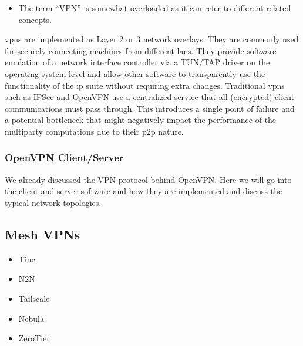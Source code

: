 \begin{itemize}
\begin{itemize}

    \begin{itemize}
    \tightlist
    \item
      The term ``VPN'' is somewhat overloaded as it can refer to
      different related concepts.
    \end{itemize}

    \glspl{vpn} are implemented as Layer 2 or 3 network overlays. They
    are commonly used for securely connecting machines from different
    \glspl{lan}. They provide software emulation of a network interface
    controller via a TUN/TAP driver on the operating system level and
    allow other software to transparently use the functionality of the
    \gls{ip} suite without requiring extra changes. Traditional
    \glspl{vpn} such as IPSec \autocite{ipSecRFC} and OpenVPN
    \autocite{openVPNDocs} use a centralized service that all
    (encrypted) client communications must pass through. This introduces
    a single point of failure and a potential bottleneck that might
    negatively impact the performance of the multiparty computations due
    to their \gls{p2p} nature.
  \end{itemize}
\end{itemize}

\hypertarget{openvpn-clientserver}{%
\subsubsection{OpenVPN Client/Server}\label{openvpn-clientserver}}

We already discussed the VPN protocol behind OpenVPN. Here we will go
into the client and server software and how they are implemented and
discuss the typical network topologies.

\hypertarget{mesh-vpns}{%
\subsection{Mesh VPNs}\label{mesh-vpns}}

\begin{itemize}
\tightlist
\item
  Tinc
\item
  N2N
\item
  Tailscale
\item
  Nebula
\item
  ZeroTier
\end{itemize}

